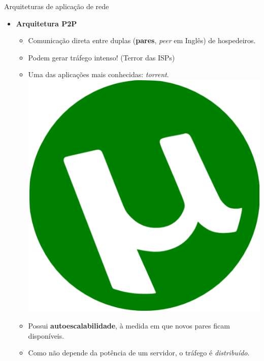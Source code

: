 \documentclass{libs/ufc_format}
\begin{document}
\begin{frame}{Arquiteturas de aplicação de rede}
    \begin{itemize}
        \item \textbf{Arquitetura P2P}
            \begin{itemize}
                \justifying
                \item Comunicação direta entre duplas (\textbf{pares}, \textit{peer} em Inglês) de hospedeiros.
                \item<2-> Podem gerar tráfego intenso! (Terror das ISPs)
                \item<3-> Uma das aplicações mais conhecidas: \textit{torrent}.\\
                \centering
                \includegraphics[scale = 0.1]{figuras/figura02_04}
                \item<4-> Possui \textbf{autoescalabilidade}, à medida em que novos pares ficam disponíveis.
                \item<5-> Como não depende da potência de um servidor, o tráfego é \textit{distribuído}.
            \end{itemize}
    \end{itemize}
\end{frame}
\end{document}

